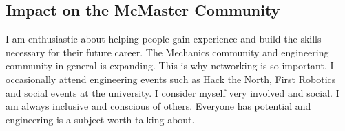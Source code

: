 \documentclass[14pt, a4paper]{awesome-cv}
\begin{document}
\begin{cvletter}
\section*{Impact on the McMaster Community}
I am enthusiastic about helping people gain experience and build the skills necessary for their future career.  The Mechanics community and engineering community in general is expanding.  This is why networking is so important.  I occasionally attend engineering events such as Hack the North, First Robotics and social events at the university.  I consider myself very involved and social.  I am always inclusive and conscious of others.  Everyone has potential and engineering is a subject worth talking about.

\end{cvletter}

\end{document}
